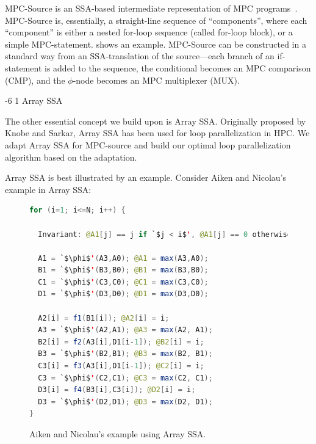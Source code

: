 \documentclass[sigconf, screen, natbib=false, dvipsnames, table]{acmart}
\makeatletter
\renewcommand{\subsubsection}{\@startsection{subsubsection}{3}{\z@}%
                        {-6\p@ \@plus -4\p@ \@minus -4\p@}%
                        {1\p@ \@plus 1\p@ \@minus 0\p@}%
                        {\normalfont\normalsize\bfseries\boldmath}}
\theoremstyle{definition}
\makeatother
\begin{document}
MPC-Source is an SSA-based intermediate representation
of MPC programs~\cite{ccs paper}. MPC-Source is, essentially, a straight-line sequence
of ``components'', where each ``component'' is either a nested for-loop sequence (called for-loop block), 
or a simple MPC-statement.  shows an example. MPC-Source can be constructed
in a standard way from an SSA-translation of the source---each branch of an 
{\sf if}-statement is added to the sequence, the conditional becomes an MPC comparison (CMP), 
and the $\phi$-node becomes an MPC multiplexer (MUX). 


\subsubsection{Array SSA} 

The other essential concept we build upon is Array SSA. 
Originally proposed by Knobe and Sarkar, Array SSA has been used for loop parallelization in HPC.
We adapt Array SSA for MPC-source and build our optimal loop parallelization algorithm
based on the adaptation.


Array SSA is best illustrated by an example. Consider Aiken and Nicolau's example in Array SSA:

\begin{figure}
\begin{lstlisting}[language=Java,escapeinside=`']
for (i=1; i<=N; i++) {

  Invariant: @A1[j] == j if `$j < i$', @A1[j] == 0 otherwise

  A1 = `$\phi$'(A3,A0); @A1 = max(A3,A0);  
  B1 = `$\phi$'(B3,B0); @B1 = max(B3,B0);
  C1 = `$\phi$'(C3,C0); @C1 = max(C3,C0);
  D1 = `$\phi$'(D3,D0); @D1 = max(D3,D0);

  A2[i] = f1(B1[i]); @A2[i] = i;
  A3 = `$\phi$'(A2,A1); @A3 = max(A2, A1);
  B2[i] = f2(A3[i],D1[i-1]); @B2[i] = i;
  B3 = `$\phi$'(B2,B1); @B3 = max(B2, B1);
  C3[i] = f3(A3[i],D1[i-1]); @C2[i] = i;
  C3 = `$\phi$'(C2,C1); @C3 = max(C2, C1);
  D3[i] = f4(B3[i],C3[i]); @D2[i] = i;
  D3 = `$\phi$'(D2,D1); @D3 = max(D2, D1); 
}
\end{lstlisting}
\caption{Aiken and Nicolau's example using Array SSA.}
\label{fig:ArraySSAAikenNicolau}
\end{figure}
\end{document}
